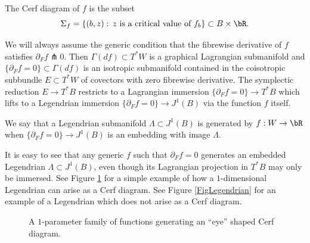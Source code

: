 \begin{definition}
The Cerf diagram of $f$ is the subset
\[
\Sigma_f=\{ (b,z) : \, \text{$z$ is a critical value of $f_b$} \} \subset B \times \bR.
\]
\end{definition}

We will always assume the generic condition that the fibrewise derivative of $f$ satisfies $\partial_F f \pitchfork 0 $. Then $\Gamma(df) \subset T^*W$ is a graphical Lagrangian submanifold and $ \{ \partial_F f = 0 \} \subset \Gamma(df)$ is an isotropic submanifold contained in the coisotropic subbundle $E \subset T^*W$ of covectors with zero fibrewise derivative. The symplectic reduction $E \to T^*B$ restricts to a Lagrangian immersion $\{ \partial_F f= 0 \} \to T^*B$ which lifts to a Legendrian immersion $\{ \partial_Ff = 0 \} \to J^1(B)$ via the function $f$ itself.

\begin{definition} We say that a Legendrian submanifold $\Lambda \subset J^1(B)$ is generated by $f:W \to \bR$ when $\{ \partial_F f = 0 \} \to J^1 (B)$ is an embedding with image $\Lambda$.
\end{definition}

It is easy to see that any generic $f$ such that $\partial_F f = 0$ generates an embedded Legendrian $\Lambda \subset J^1(B)$, even though its Lagrangian projection in $T^*B$ may only be immersed. See Figure \ref{Fig: simple Legendrian} for a simple example of how a $1$-dimensional Legendrian can arise as a Cerf diagram. See Figure \ref{FigLegendrian} for an example of a Legendrian which does not arise as a Cerf diagram.
\begin{figure}[htbp]
\begin{center}
\caption{\smaller A $1$-parameter family of functions generating an ``eye'' shaped Cerf diagram.}
\label{Fig: simple Legendrian}
\end{center}
\end{figure}


